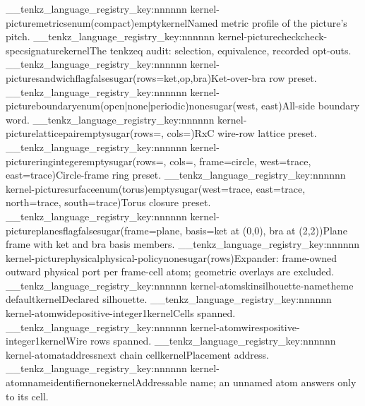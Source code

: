 \__tenkz_language_registry_key:nnnnnn {kernel-picture}{metrics}{enum(compact)}{empty}{kernel}{Named metric profile of the picture's pitch.}
\__tenkz_language_registry_key:nnnnnn {kernel-picture}{check}{check-spec}{signature}{kernel}{The tenkzeq audit: selection, equivalence, recorded opt-outs.}
\__tenkz_language_registry_key:nnnnnn {kernel-picture}{sandwich}{flag}{false}{sugar(rows={ket,op,bra})}{Ket-over-bra row preset.}
\__tenkz_language_registry_key:nnnnnn {kernel-picture}{boundary}{enum(open|none|periodic)}{none}{sugar(west, east)}{All-side boundary word.}
\__tenkz_language_registry_key:nnnnnn {kernel-picture}{lattice}{pair}{empty}{sugar(rows=, cols=)}{RxC wire-row lattice preset.}
\__tenkz_language_registry_key:nnnnnn {kernel-picture}{ring}{integer}{empty}{sugar(rows=, cols=, frame=circle, west=trace, east=trace)}{Circle-frame ring preset.}
\__tenkz_language_registry_key:nnnnnn {kernel-picture}{surface}{enum(torus)}{empty}{sugar(west=trace, east=trace, north=trace, south=trace)}{Torus closure preset.}
\__tenkz_language_registry_key:nnnnnn {kernel-picture}{planes}{flag}{false}{sugar(frame={plane, basis={ket at (0,0), bra at (2,2)}})}{Plane frame with ket and bra basis members.}
\__tenkz_language_registry_key:nnnnnn {kernel-picture}{physical}{physical-policy}{none}{sugar(rows)}{Expander: frame-owned outward physical port per frame-cell atom; geometric overlays are excluded.}
\__tenkz_language_registry_key:nnnnnn {kernel-atom}{skin}{silhouette-name}{theme default}{kernel}{Declared silhouette.}
\__tenkz_language_registry_key:nnnnnn {kernel-atom}{wide}{positive-integer}{1}{kernel}{Cells spanned.}
\__tenkz_language_registry_key:nnnnnn {kernel-atom}{wires}{positive-integer}{1}{kernel}{Wire rows spanned.}
\__tenkz_language_registry_key:nnnnnn {kernel-atom}{at}{address}{next chain cell}{kernel}{Placement address.}
\__tenkz_language_registry_key:nnnnnn {kernel-atom}{name}{identifier}{none}{kernel}{Addressable name; an unnamed atom answers only to its cell.}
